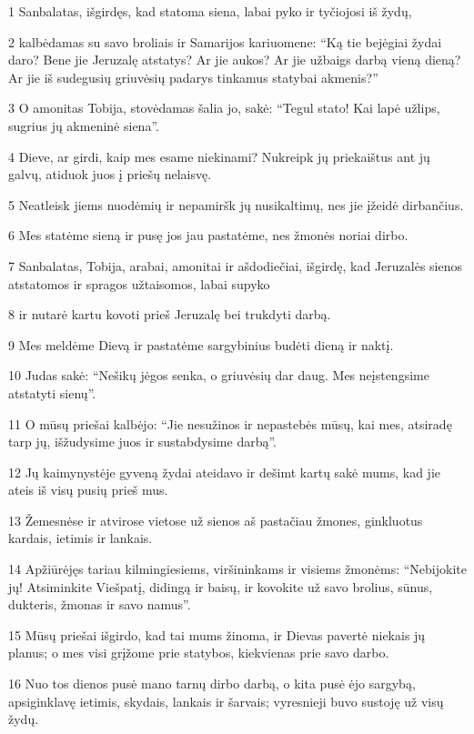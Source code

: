 \par 1 Sanbalatas, išgirdęs, kad statoma siena, labai pyko ir tyčiojosi iš žydų, 
\par 2 kalbėdamas su savo broliais ir Samarijos kariuomene: “Ką tie bejėgiai žydai daro? Bene jie Jeruzalę atstatys? Ar jie aukos? Ar jie užbaigs darbą vieną dieną? Ar jie iš sudegusių griuvėsių padarys tinkamus statybai akmenis?” 
\par 3 O amonitas Tobija, stovėdamas šalia jo, sakė: “Tegul stato! Kai lapė užlips, sugrius jų akmeninė siena”. 
\par 4 Dieve, ar girdi, kaip mes esame niekinami? Nukreipk jų priekaištus ant jų galvų, atiduok juos į priešų nelaisvę. 
\par 5 Neatleisk jiems nuodėmių ir nepamiršk jų nusikaltimų, nes jie įžeidė dirbančius. 
\par 6 Mes statėme sieną ir pusę jos jau pastatėme, nes žmonės noriai dirbo. 
\par 7 Sanbalatas, Tobija, arabai, amonitai ir ašdodiečiai, išgirdę, kad Jeruzalės sienos atstatomos ir spragos užtaisomos, labai supyko 
\par 8 ir nutarė kartu kovoti prieš Jeruzalę bei trukdyti darbą. 
\par 9 Mes meldėme Dievą ir pastatėme sargybinius budėti dieną ir naktį. 
\par 10 Judas sakė: “Nešikų jėgos senka, o griuvėsių dar daug. Mes neįstengsime atstatyti sienų”. 
\par 11 O mūsų priešai kalbėjo: “Jie nesužinos ir nepastebės mūsų, kai mes, atsiradę tarp jų, išžudysime juos ir sustabdysime darbą”. 
\par 12 Jų kaimynystėje gyveną žydai ateidavo ir dešimt kartų sakė mums, kad jie ateis iš visų pusių prieš mus. 
\par 13 Žemesnėse ir atvirose vietose už sienos aš pastačiau žmones, ginkluotus kardais, ietimis ir lankais. 
\par 14 Apžiūrėjęs tariau kilmingiesiems, viršininkams ir visiems žmonėms: “Nebijokite jų! Atsiminkite Viešpatį, didingą ir baisų, ir kovokite už savo brolius, sūnus, dukteris, žmonas ir savo namus”. 
\par 15 Mūsų priešai išgirdo, kad tai mums žinoma, ir Dievas pavertė niekais jų planus; o mes visi grįžome prie statybos, kiekvienas prie savo darbo. 
\par 16 Nuo tos dienos pusė mano tarnų dirbo darbą, o kita pusė ėjo sargybą, apsiginklavę ietimis, skydais, lankais ir šarvais; vyresnieji buvo sustoję už visų žydų. 
